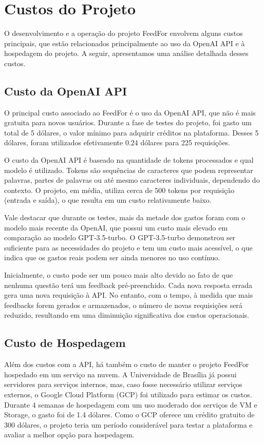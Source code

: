 \section{Custos do Projeto}

O desenvolvimento e a operação do projeto FeedFor envolvem alguns custos principais, que estão relacionados principalmente ao uso da OpenAI API e à hospedagem do projeto. A seguir, apresentamos uma análise detalhada desses custos.

\subsection{Custo da OpenAI API}

O principal custo associado ao FeedFor é o uso da OpenAI API, que não é mais gratuita para novos usuários. Durante a fase de testes do projeto, foi gasto um total de 5 dólares, o valor mínimo para adquirir créditos na plataforma. Desses 5 dólares, foram utilizados efetivamente 0.24 dólares para 225 requisições.

O custo da OpenAI API é baseado na quantidade de tokens processados e qual modelo é utilizado. Tokens são sequências de caracteres que podem representar palavras, partes de palavras ou até mesmo caracteres individuais, dependendo do contexto. O projeto, em média, utiliza cerca de 500 tokens por requisição (entrada e saída), o que resulta em um custo relativamente baixo.

Vale destacar que durante os testes, mais da metade dos gastos foram com o modelo mais recente da OpenAI, que possui um custo mais elevado em comparação ao modelo GPT-3.5-turbo. O GPT-3.5-turbo demonstrou ser suficiente para as necessidades do projeto e tem um custo mais acessível, o que indica que os gastos reais podem ser ainda menores no uso contínuo.

Inicialmente, o custo pode ser um pouco mais alto devido ao fato de que nenhuma questão terá um feedback pré-preenchido. Cada nova resposta errada gera uma nova requisição à API. No entanto, com o tempo, à medida que mais feedbacks forem gerados e armazenados, o número de novas requisições será reduzido, resultando em uma diminuição significativa dos custos operacionais.

\subsection{Custo de Hospedagem}

Além dos custos com a API, há também o custo de manter o projeto FeedFor hospedado em um serviço na nuvem. A Universidade de Brasília já possui servidores para serviços internos, mas, caso fosse necessário utilizar serviços externos, o Google Cloud Platform (GCP) foi utilizado para estimar os custos. Durante 4 semanas de hospedagem com um uso moderado dos serviços de VM e Storage, o gasto foi de 1.4 dólares. Como o GCP oferece um crédito gratuito de 300 dólares, o projeto teria um período considerável para testar a plataforma e avaliar a melhor opção para hospedagem.

